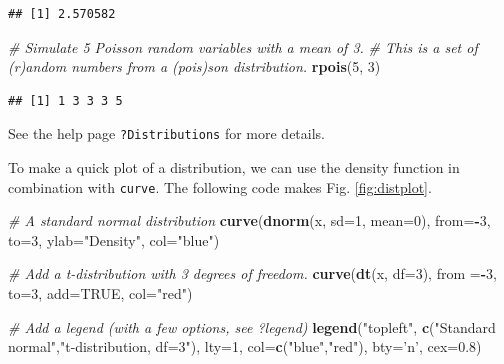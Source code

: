 \documentclass[]{book}
\newenvironment{Shaded}{\begin{snugshade}}{\end{snugshade}}
\newcommand{\CommentTok}[1]{\textcolor[rgb]{0.56,0.35,0.01}{\textit{#1}}}
\newcommand{\DataTypeTok}[1]{\textcolor[rgb]{0.13,0.29,0.53}{#1}}
\newcommand{\DecValTok}[1]{\textcolor[rgb]{0.00,0.00,0.81}{#1}}
\newcommand{\FloatTok}[1]{\textcolor[rgb]{0.00,0.00,0.81}{#1}}
\newcommand{\KeywordTok}[1]{\textcolor[rgb]{0.13,0.29,0.53}{\textbf{#1}}}
\newcommand{\NormalTok}[1]{#1}
\newcommand{\OperatorTok}[1]{\textcolor[rgb]{0.81,0.36,0.00}{\textbf{#1}}}
\newcommand{\OtherTok}[1]{\textcolor[rgb]{0.56,0.35,0.01}{#1}}
\newcommand{\StringTok}[1]{\textcolor[rgb]{0.31,0.60,0.02}{#1}}
\begin{document}
\begin{verbatim}
## [1] 2.570582
\end{verbatim}

\begin{Shaded}
\begin{Highlighting}[]
\CommentTok{# Simulate 5 Poisson random variables with a mean of 3. }
\CommentTok{# This is a set of (r)andom numbers from a (pois)son distribution.}
\KeywordTok{rpois}\NormalTok{(}\DecValTok{5}\NormalTok{, }\DecValTok{3}\NormalTok{)}
\end{Highlighting}
\end{Shaded}

\begin{verbatim}
## [1] 1 3 3 3 5
\end{verbatim}

See the help page \texttt{?Distributions} for more details.

To make a quick plot of a distribution, we can use the density function in combination with \texttt{curve}. The following code makes Fig. \ref{fig:distplot}.

\begin{Shaded}
\begin{Highlighting}[]
\CommentTok{# A standard normal distribution}
\KeywordTok{curve}\NormalTok{(}\KeywordTok{dnorm}\NormalTok{(x, }\DataTypeTok{sd=}\DecValTok{1}\NormalTok{, }\DataTypeTok{mean=}\DecValTok{0}\NormalTok{), }\DataTypeTok{from=}\OperatorTok{-}\DecValTok{3}\NormalTok{, }\DataTypeTok{to=}\DecValTok{3}\NormalTok{,}
      \DataTypeTok{ylab=}\StringTok{"Density"}\NormalTok{, }\DataTypeTok{col=}\StringTok{"blue"}\NormalTok{)}

\CommentTok{# Add a t-distribution with 3 degrees of freedom.}
\KeywordTok{curve}\NormalTok{(}\KeywordTok{dt}\NormalTok{(x, }\DataTypeTok{df=}\DecValTok{3}\NormalTok{), }\DataTypeTok{from =}\OperatorTok{-}\DecValTok{3}\NormalTok{, }\DataTypeTok{to=}\DecValTok{3}\NormalTok{, }\DataTypeTok{add=}\OtherTok{TRUE}\NormalTok{, }\DataTypeTok{col=}\StringTok{"red"}\NormalTok{)}

\CommentTok{# Add a legend (with a few options, see ?legend)}
\KeywordTok{legend}\NormalTok{(}\StringTok{"topleft"}\NormalTok{, }\KeywordTok{c}\NormalTok{(}\StringTok{"Standard normal"}\NormalTok{,}\StringTok{"t-distribution, df=3"}\NormalTok{), }\DataTypeTok{lty=}\DecValTok{1}\NormalTok{, }\DataTypeTok{col=}\KeywordTok{c}\NormalTok{(}\StringTok{"blue"}\NormalTok{,}\StringTok{"red"}\NormalTok{),}
       \DataTypeTok{bty=}\StringTok{'n'}\NormalTok{, }\DataTypeTok{cex=}\FloatTok{0.8}\NormalTok{)}
\end{Highlighting}
\end{Shaded}
\end{document}
